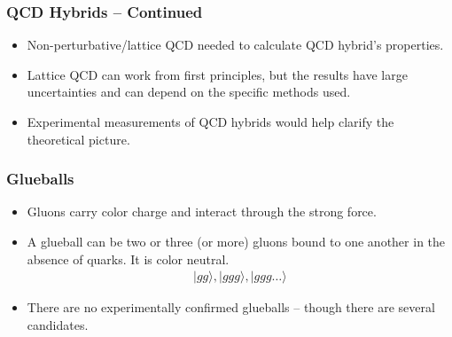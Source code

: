 \documentclass[mathserif,18pt,xcolor=table]{beamer}
\begin{document}
\begin{frame}
  \frametitle{QCD Hybrids -- Continued}
  \begin{itemize}
  \item Non-perturbative/lattice QCD needed to calculate QCD hybrid's properties.
  \item Lattice QCD can work from first principles, but the results have large uncertainties and can depend on the specific methods used.
  \item Experimental measurements of QCD hybrids would help clarify the theoretical picture.
  \end{itemize}
\end{frame}

\begin{frame}
  \frametitle{Glueballs}
  \begin{itemize}
  \item Gluons carry color charge and interact through the strong force.
  \item A glueball can be two or three (or more) gluons bound to one another in the absence of quarks.  It is color neutral.
    \begin{align}
      |gg\rangle, |ggg\rangle, |ggg\ldots\rangle
    \end{align}
  \item There are no experimentally confirmed glueballs – though there are several candidates.
  \end{itemize}
\end{frame}
\end{document}
